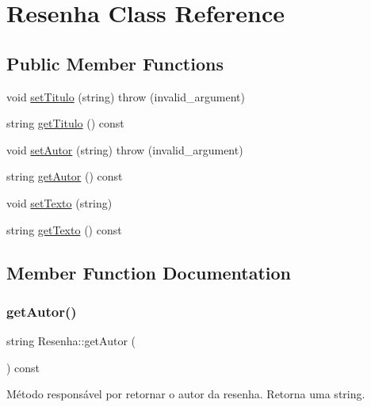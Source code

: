 \hypertarget{classResenha}{}\section{Resenha Class Reference}
\label{classResenha}
\subsection*{Public Member Functions}
\begin{DoxyCompactItemize}
\item 
void \hyperlink{classResenha_a4f2bf94388381e3ce05fe5d63ac23e4f}{set\+Titulo} (string)  throw (invalid\+\_\+argument)
\item 
string \hyperlink{classResenha_a8c0966bc51ba8d43c769594446797d9f}{get\+Titulo} () const
\item 
void \hyperlink{classResenha_a93b2d590fce3efecb9d1a2a5c1ab4ef1}{set\+Autor} (string)  throw (invalid\+\_\+argument)
\item 
string \hyperlink{classResenha_a9ba7b00c49de97e2c29caba9b229dfab}{get\+Autor} () const
\item 
void \hyperlink{classResenha_a6fd61b3ffeee4365aa8aaab69b16d41a}{set\+Texto} (string)
\item 
string \hyperlink{classResenha_a17b193d598f0b50f90310a67afc0b524}{get\+Texto} () const
\end{DoxyCompactItemize}


\subsection{Member Function Documentation}
\mbox{\label{classResenha_a9ba7b00c49de97e2c29caba9b229dfab}} 
\subsubsection{\texorpdfstring{get\+Autor()}{getAutor()}}
{\footnotesize\ttfamily string Resenha\+::get\+Autor (\begin{DoxyParamCaption}{ }\end{DoxyParamCaption}) const\hspace{0.3cm}{\ttfamily [inline]}}

Método responsável por retornar o autor da resenha. Retorna uma string. \mbox{\label{classResenha_a17b193d598f0b50f90310a67afc0b524}} 
